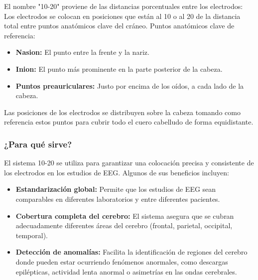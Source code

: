\documentclass{article}
\begin{document}
El nombre "10-20" proviene de las distancias porcentuales entre los electrodos: Los electrodos se colocan en posiciones que están al 10 o al 20 de la distancia total entre puntos anatómicos clave del cráneo.
Puntos anatómicos clave de referencia:
\begin{itemize}
    \item \textbf{Nasion:} El punto entre la frente y la nariz.
    \item \textbf{Inion:} El punto más prominente en la parte posterior de la cabeza.
    \item \textbf{Puntos preauriculares:} Justo por encima de los oídos, a cada lado de la cabeza.
\end{itemize}
Las posiciones de los electrodos se distribuyen sobre la cabeza tomando como referencia estos puntos para cubrir todo el cuero cabelludo de forma equidistante.
\subsubsection{¿Para qué sirve?}
El sistema 10-20 se utiliza para garantizar una colocación precisa y consistente de los electrodos en los estudios de EEG. Algunos de sus beneficios incluyen:
\begin{itemize}
    \item \textbf{Estandarización global:} Permite que los estudios de EEG sean comparables en diferentes laboratorios y entre diferentes pacientes.
    \item \textbf{Cobertura completa del cerebro:} El sistema asegura que se cubran adecuadamente diferentes áreas del cerebro (frontal, parietal, occipital, temporal).
    \item \textbf{Detección de anomalías:} Facilita la identificación de regiones del cerebro donde pueden estar ocurriendo fenómenos anormales, como descargas epilépticas, actividad lenta anormal o asimetrías en las ondas cerebrales.
\end{itemize}
\end{document}

